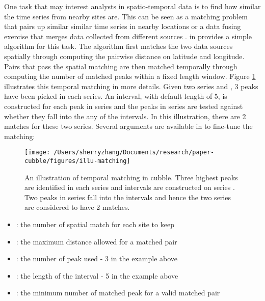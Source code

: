 \documentclass[
]{jss}
\providecommand{\tightlist}{%
  \setlength{\itemsep}{0pt}\setlength{\parskip}{0pt}}
\begin{document}
One task that may interest analysts in spatio-temporal data is to find
how similar the time series from nearby sites are. This can be seen as a
matching problem \citep{stuart2010matching, mcintosh2018using} that
pairs up similar similar time series in nearby locations or a data
fusing exercise that merges data collected from different sources
\citep{cocchi2019data}.  in  provides a
simple algorithm for this task. The algorithm first matches the two data
sources spatially through computing the pairwise distance on latitude
and longitude. Pairs that pass the spatial matching are then matched
temporally through computing the number of matched peaks within a fixed
length window. Figure \ref{fig:illu-matching} illustrates this temporal
matching in more details. Given two series  and , 3
peaks have been picked in each series. An interval, with default length
of 5, is constructed for each peak in series  and the peaks in
series  are tested against whether they fall into the any of the
intervals. In this illustration, there are 2 matches for these two
series. Several arguments are available in  to
fine-tune the matching:

\begin{CodeChunk}
\begin{figure}

{\centering \texttt{[image: /Users/sherryzhang/Documents/research/paper-cubble/figures/illu-matching]} 

}

\caption{An illustration of temporal matching in cubble. Three highest peaks are identified in each series and intervals are constructed on series . Two peaks in series  fall into the intervals and hence the two series are considered to have 2 matches.}\label{fig:illu-matching}
\end{figure}
\end{CodeChunk}

\begin{itemize}
\tightlist
\item
  : the number of spatial match for each site to
  keep
\item
  : the maximum distance allowed for a matched
  pair
\item
  : the number of peak used - 3 in the example
  above
\item
  : the length of the interval - 5 in the example
  above
\item
  : the minimum number of matched peak for a
  valid matched pair
\end{itemize}
\end{document}
